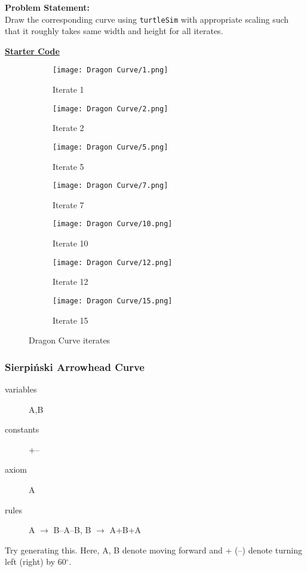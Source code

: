 \textbf{Problem Statement:}\\
Draw the corresponding curve using \verb!turtleSim! with appropriate scaling such that it roughly takes same width and height for all iterates.
\begin{tcolorbox}%
	\href{https://github.com/paramrathour/CS-101/tree/main/Starter Codes/Dragon Curve.cpp}{\textbf{Starter Code}}
\end{tcolorbox}
\begin{figure}[H]
	\centering
	\begin{subfigure}{0.1\linewidth}
		\texttt{[image: Dragon Curve/1.png]}
		\caption{Iterate 1}
	\end{subfigure}
	\begin{subfigure}{0.08\linewidth}
		\texttt{[image: Dragon Curve/2.png]}
		\caption{Iterate 2}
	\end{subfigure}
	\begin{subfigure}{0.12\linewidth}
		\texttt{[image: Dragon Curve/5.png]}
		\caption{Iterate 5}
	\end{subfigure}
	\begin{subfigure}{0.16\linewidth}
		\texttt{[image: Dragon Curve/7.png]}
		\caption{Iterate 7}
	\end{subfigure}
	\begin{subfigure}{0.09\linewidth}
		\texttt{[image: Dragon Curve/10.png]}
		\caption{Iterate 10}
	\end{subfigure}
	\begin{subfigure}{0.18\linewidth}
		\texttt{[image: Dragon Curve/12.png]}
		\caption{Iterate 12}
	\end{subfigure}
	\begin{subfigure}{0.18\linewidth}
		\texttt{[image: Dragon Curve/15.png]}
		\caption{Iterate 15}
	\end{subfigure}
	\caption{Dragon Curve iterates}
\end{figure}
\vspace{-2em}
\subsubsection{Sierpi\'nski Arrowhead Curve}{\label{pp:sierpinskicurve}}
\begin{description}
	\item[variables] A,B
	\item[constants] +--
	\item[axiom] A
	\item[rules] A $\rightarrow$ B--A--B, B $\rightarrow$ A+B+A
\end{description}
Try generating this. Here, A, B denote moving forward and + (--) denote turning left (right) by 60$^\circ$.

